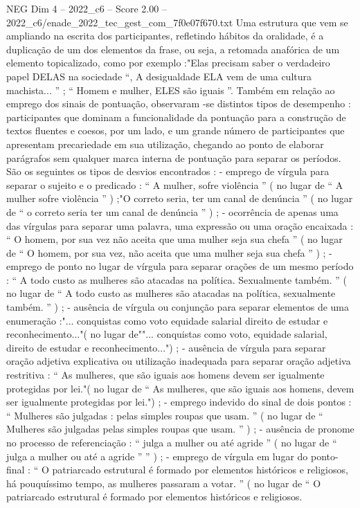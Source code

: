 \begin{textsample}{NEG Dim 4 – 2022\_c6 – Score 2.00 – 2022\_c6/enade\_2022\_tec\_gest\_com\_7f0e07f670.txt}
Uma estrutura que vem se ampliando na escrita dos participantes, refletindo hábitos da oralidade, é a duplicação de um dos elementos da frase, ou seja, a retomada anafórica de um elemento topicalizado, como por exemplo :"Elas precisam saber o verdadeiro papel DELAS na sociedade “, A desigualdade ELA vem de uma cultura machista... ” ; “ Homem e mulher, ELES são iguais ”.
Também em relação ao emprego dos sinais de pontuação, observaram -se distintos tipos de desempenho : participantes que dominam a funcionalidade da pontuação para a construção de textos fluentes e coesos, por um lado, e um grande número de participantes que apresentam precariedade em sua utilização, chegando ao ponto de elaborar parágrafos sem qualquer marca interna de pontuação para separar os períodos.
São os seguintes os tipos de desvios encontrados : - emprego de vírgula para separar o sujeito e o predicado : “ A mulher, sofre violência ” ( no lugar de “ A mulher sofre violência ” ) ;"O correto seria, ter um canal de denúncia ” ( no lugar de “ o correto seria ter um canal de denúncia ” ) ; - ocorrência de apenas uma das vírgulas para separar uma palavra, uma expressão ou uma oração encaixada : “ O homem, por sua vez não aceita que uma mulher seja sua chefa ” ( no lugar de “ O homem, por sua vez, não aceita que uma mulher seja sua chefa ” ) ; - emprego de ponto no lugar de vírgula para separar orações de um mesmo período : “ A todo custo as mulheres são atacadas na política.
Sexualmente também. ” ( no lugar de “ A todo custo as mulheres são atacadas na política, sexualmente também. ” ) ; - ausência de vírgula ou conjunção para separar elementos de uma enumeração :"... conquistas como voto equidade salarial direito de estudar e reconhecimento..."( no lugar de""... conquistas como voto, equidade salarial, direito de estudar e reconhecimento...") ; - ausência de vírgula para separar oração adjetiva explicativa ou utilização inadequada para separar oração adjetiva restritiva : “ As mulheres, que são iguais aos homens devem ser igualmente protegidas por lei."( no lugar de “ As mulheres, que são iguais aos homens, devem ser igualmente protegidas por lei.") ; - emprego indevido do sinal de dois pontos : “ Mulheres são julgadas : pelas simples roupas que usam. ” ( no lugar de “ Mulheres são julgadas pelas simples roupas que usam. ” ) ; - ausência de pronome no processo de referenciação : “ julga a mulher ou até agride ” ( no lugar de “ julga a mulher ou até a agride ” ” ) ; - emprego de vírgula em lugar do ponto-final : “ O patriarcado estrutural é formado por elementos históricos e religiosos, há pouquíssimo tempo, as mulheres passaram a votar. ” ( no lugar de “ O patriarcado estrutural é formado por elementos históricos e religiosos.

\end{textsample}
